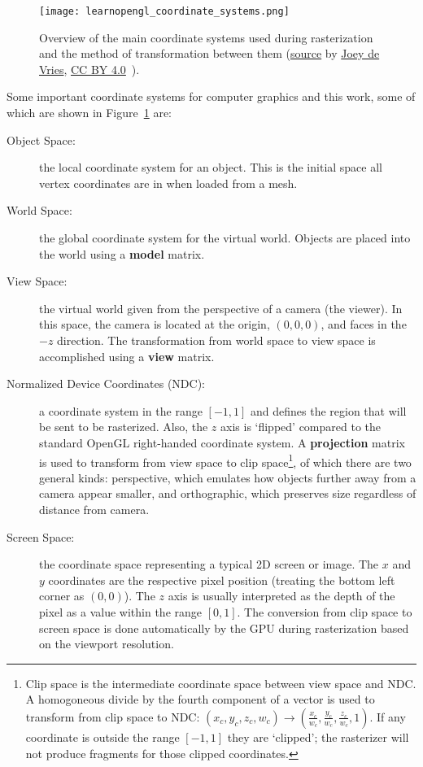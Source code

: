 \begin{figure}[h]
\centering
\texttt{[image: learnopengl\_coordinate\_systems.png]}
\caption{Overview of the main coordinate systems used during rasterization and the method of transformation between them (\href{https://learnopengl.com/img/getting-started/coordinate_systems.png}{source} by \href{https://twitter.com/JoeyDeVriez}{Joey de Vries}, \href{https://creativecommons.org/licenses/by/4.0/}{CC BY 4.0}~\cite{learnopengl}).}
\label{fig:coordinate_systems}
\end{figure}

Some important coordinate systems for computer graphics and this work, some of which are shown in Figure~\ref{fig:coordinate_systems} are:
\begin{description}
    \item[Object Space:] the local coordinate system for an object. This is the initial space all vertex coordinates are in when loaded from a mesh.
    \item[World Space:] the global coordinate system for the virtual world. Objects are placed into the world using a \textbf{model} matrix.
    \item[View Space:] the virtual world given from the perspective of a camera (the viewer). In this space, the camera is located at the origin, $(0,0,0)$, and faces in the $-z$ direction. The transformation from world space to view space is accomplished using a \textbf{view} matrix.
    \item[Normalized Device Coordinates (NDC):] a coordinate system in the range $[-1, 1]$ and defines the region that will be sent to be rasterized. Also, the $z$ axis is `flipped' compared to the standard OpenGL right-handed coordinate system. A \textbf{projection} matrix is used to transform from view space to clip space\footnote{Clip space is the intermediate coordinate space between view space and NDC. A homogoneous divide by the fourth component of a vector is used to transform from clip space to NDC: $(x_c, y_c, z_c, w_c) \rightarrow (\frac{x_c}{w_c}, \frac{y_c}{w_c}, \frac{z_c}{w_c}, 1)$. If any coordinate is outside the range $[-1, 1]$ they are `clipped'; the rasterizer will not produce fragments for those clipped coordinates. }, of which there are two general kinds: perspective, which emulates how objects further away from a camera appear smaller, and orthographic, which preserves size regardless of distance from camera.
    \item[Screen Space:] the coordinate space representing a typical 2D screen or image. The $x$ and $y$ coordinates are the respective pixel position (treating the bottom left corner as $(0,0)$). The $z$ axis is usually interpreted as the depth of the pixel as a value within the range $[0, 1]$. The conversion from clip space to screen space is done automatically by the GPU during rasterization based on the viewport resolution.

\end{description}
